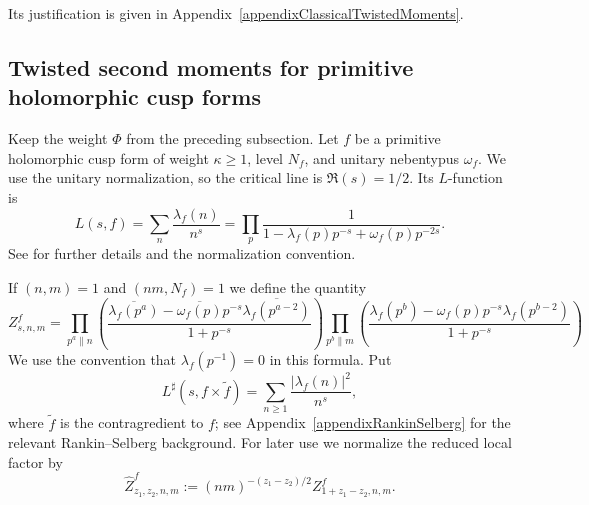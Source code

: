 \documentclass[oneside, 12pt]{amsart}
\theoremstyle{definition}
\begin{document}
	{Its justification is given in
		Appendix~\ref{appendixClassicalTwistedMoments}.}
	
	\subsection{Twisted second moments for primitive holomorphic cusp forms}\label{holomorphicCuspTwistedMomentSection}
	{Keep the weight $\Phi$ from the preceding subsection.
		Let $f$ be a primitive holomorphic cusp form of weight
		$\kappa\geq1$, level $N_f$, and unitary nebentypus $\omega_f$.  We use
		the unitary normalization, so the critical line is $\Re(s)=1/2$.  Its
		$L$-function is}
	\[
	L(s,f)=\sum_n \frac{\lambda_f(n)}{n^s}
	=\prod_{p} \frac{1}{1-\lambda_f(p)p^{-s}+\omega_f(p)p^{-2s}}.
	\]
	{See \cite[Section 5.11]{IwaniecKowalski} for further
		details and the normalization convention.}
	
	If $(n,m)=1$ and $(nm,N_f)=1$ we define the quantity $$Z_{s,n,m}^f = \prod_{p^a \| n} \left(\frac{\overline{\lambda_f(p^a)}-\overline{\omega_f(p)}p^{-s}\overline{\lambda_f(p^{a-2})}}{1+p^{-s}}\right) \prod_{p^b \| m} \left(\frac{\lambda_f(p^b)-\omega_f(p)p^{-s}\lambda_f(p^{b-2})}{1+p^{-s}}\right)$$ 
	We use the convention that $\lambda_f(p^{-1})=0$ in this formula.
	{Put}
	$$L^{\sharp}(s,f\times \widetilde{f})=\sum_{n\geq 1} \frac{|\lambda_f(n)|^2}{n^s},$$ where $\widetilde{f}$ is the contragredient to $f$; see Appendix~\ref{appendixRankinSelberg} for the relevant Rankin--Selberg background.
	{For later use we normalize the reduced local factor by
		\begin{equation}\label{normalizedCuspLocalFactor}
			\widehat Z^f_{z_1,z_2,n,m}
			:=(nm)^{-(z_1-z_2)/2}Z^f_{1+z_1-z_2,n,m}.
	\end{equation}}
	
\end{document}
